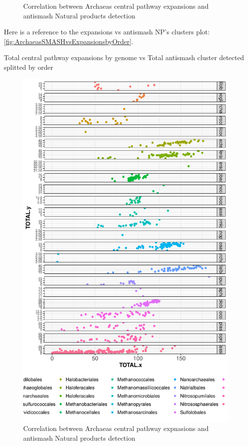 \documentclass[12pt,twoside]{reedthesis}
\begin{document}
\begin{figure}[h!tbp]
  \caption[Correlation between Archaeas central pathway expansions and antismash Natural products detection]{\normalsize{Correlation between Archaeas central pathway expansions and antismash Natural products detection}}
  \label{fig:ArchaeasSMASHvsExpansionsbyOrder}
  \end{figure}
  
  Here is a reference to the expansions vs antismash NP's clusters plot:
  \autoref{fig:ArchaeasSMASHvsExpansionsbyOrder}. \clearpage 
  
  Total central pathway expansions by genome vs Total antismash cluster
  detected splitted by order
  
  \begin{figure}[h!tbp]
  \centering
  \includegraphics[angle = 0,scale = 0.5]{chapter3/ArchaeasSMASHvsExpansionsbyOrderGRID.pdf}
  \caption[Correlation between Archaeas central pathway expnasions and antismash Natural products detection]{\normalsize{Correlation between Archaeas central pathway expnasions and antismash Natural products detection}}
  \label{fig:ArchaeasSMASHvsExpansionsbyOrderGRID}
  \end{figure}
  
\end{document}

